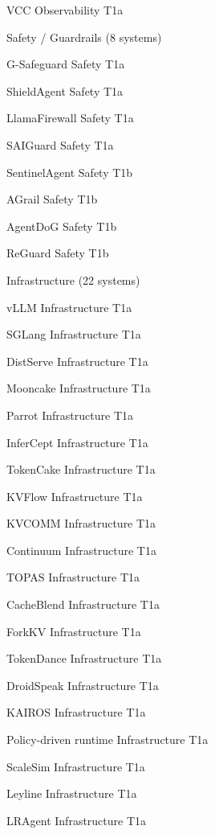 \begin{flushleft}
 VCC Observability T1a\par
\noindent  Safety / Guardrails (8 systems)\par
{} G-Safeguard Safety T1a\par
{} ShieldAgent Safety T1a\par
{} LlamaFirewall Safety T1a\par
{} SAIGuard Safety T1a\par
{} SentinelAgent Safety T1b\par
{} AGrail Safety T1b\par
{} AgentDoG Safety T1b\par
{} ReGuard Safety T1b\par
\noindent  Infrastructure (22 systems)\par
{} vLLM Infrastructure T1a\par
{} SGLang Infrastructure T1a\par
{} DistServe Infrastructure T1a\par
{} Mooncake Infrastructure T1a\par
{} Parrot Infrastructure T1a\par
{} InferCept Infrastructure T1a\par
{} TokenCake Infrastructure T1a\par
{} KVFlow Infrastructure T1a\par
{} KVCOMM Infrastructure T1a\par
{} Continuum Infrastructure T1a\par
{} TOPAS Infrastructure T1a\par
{} CacheBlend Infrastructure T1a\par
{} ForkKV Infrastructure T1a\par
{} TokenDance Infrastructure T1a\par
{} DroidSpeak Infrastructure T1a\par
{} KAIROS Infrastructure T1a\par
{} Policy-driven runtime Infrastructure T1a\par
{} ScaleSim Infrastructure T1a\par
{} Leyline Infrastructure T1a\par
{} LRAgent Infrastructure T1a\par

\end{flushleft}
